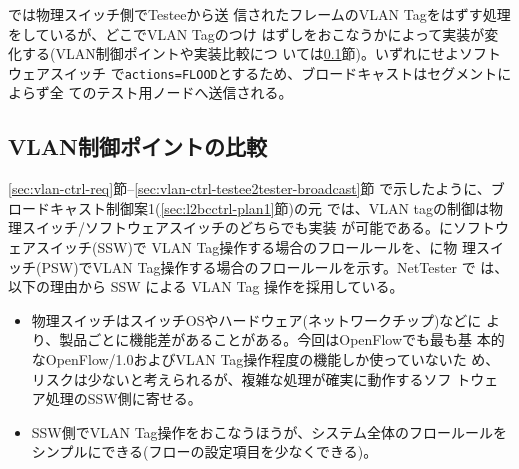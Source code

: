 では物理スイッチ側でTesteeから送
信されたフレームのVLAN Tagをはずす処理をしているが、どこでVLAN Tagのつけ
はずしをおこなうかによって実装が変化する(VLAN制御ポイントや実装比較につ
いては\ref{sec:vlan_control_point}節)。いずれにせよソフトウェアスイッチ
で\verb|actions=FLOOD|とするため、ブロードキャストはセグメントによらず全
てのテスト用ノードへ送信される。

  \subsection{VLAN制御ポイントの比較}
  \label{sec:vlan_control_point}

\ref{sec:vlan-ctrl-req}節--\ref{sec:vlan-ctrl-testee2tester-broadcast}節
で示したように、ブロードキャスト制御案1(\ref{sec:l2bcctrl-plan1}節)の元
では、VLAN tagの制御は物理スイッチ/ソフトウェアスイッチのどちらでも実装
が可能である。にソフトウェアスイッチ(SSW)で
VLAN Tag操作する場合のフロールールを、に物
理スイッチ(PSW)でVLAN Tag操作する場合のフロールールを示す。NetTester で
は、以下の理由から SSW による VLAN Tag 操作を採用している。
\begin{itemize}
 \item 物理スイッチはスイッチOSやハードウェア(ネットワークチップ)などに
       より、製品ごとに機能差があることがある。今回はOpenFlowでも最も基
       本的なOpenFlow/1.0およびVLAN Tag操作程度の機能しか使っていないた
       め、リスクは少ないと考えられるが、複雑な処理が確実に動作するソフ
       トウェア処理のSSW側に寄せる。
 \item SSW側でVLAN Tag操作をおこなうほうが、システム全体のフロールールを
       シンプルにできる(フローの設定項目を少なくできる)。
\end{itemize}

